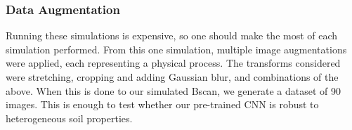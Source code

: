     \subsubsection{Data Augmentation}
    
        Running these simulations is expensive, so one should make the most of each simulation performed. From this one simulation, multiple image augmentations were applied, each representing a physical process. The transforms considered were stretching, cropping and adding Gaussian blur, and combinations of the above. When this is done to our simulated Bscan, we generate a dataset of 90 images. This is enough to test whether our pre-trained CNN is robust to heterogeneous soil properties.
        \begin{figure}[htbp]
            \centering
            

\end{figure}
